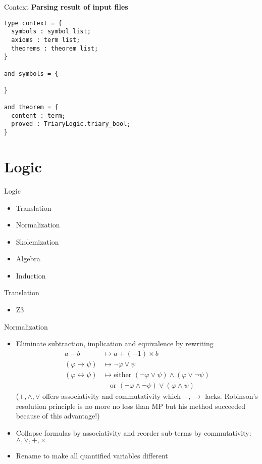 \documentclass{beamer}
\begin{document}
\begin{frame}[fragile]{Context}
\textbf{Parsing result of input files}
\begin{lstlisting}
type context = {
  symbols : symbol list;
  axioms : term list;
  theorems : theorem list;
}

and symbols = {

}

and theorem = {
  content : term;
  proved : TriaryLogic.triary_bool;
}
\end{lstlisting}
\end{frame}

\section{Logic}

\begin{frame}{Logic}
\begin{itemize}
\item Translation
\item Normalization
\item Skolemization
\item Algebra
\item Induction
\end{itemize}
\end{frame}

\begin{frame}{Translation}
\begin{itemize}
\item Z3
\end{itemize}
\end{frame}

\begin{frame}{Normalization}
\begin{itemize}
\item Eliminate subtraction, implication and equivalence by  rewriting
\begin{align*}
a - b &\mapsto a + (-1) \times b\\
(\varphi \rightarrow \psi) &\mapsto \neg \varphi \lor \psi\\
(\varphi \leftrightarrow \psi) &\mapsto \text{either }(\neg \varphi \lor \psi) \land (\varphi \lor \neg  \psi)\\
&\quad \text{or }(\neg \varphi \land \neg \psi) \lor (\varphi \land \psi)
\end{align*}
($+, \land, \lor$ offers associativity and commutativity which $-,\rightarrow$ lacks. Robinson's resolution principle is no more no less than MP but his method succeeded because of this advantage!)
\item Collapse formulas by associativity and reorder sub-terms by commutativity: $\land, \lor, +, \times$
\item Rename to make all quantified variables different
\end{itemize}
\end{frame}
\end{document}
